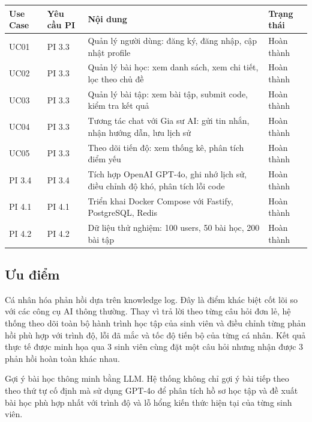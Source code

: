 \documentclass[../main.tex]{subfiles}
\begin{document}
{
\renewcommand{\arraystretch}{1.5}
\begin{tabularx}{\textwidth}{|p{2.0cm}|p{3.5cm}|X|p{3.5cm}|}
\caption{Checklist thi công các Use Case theo yêu cầu PI}
\label{tab:checklist-thi-cong-cac-use-case-theo-yeu-cau-pi}
\\
\hline
\textbf{Use Case} & \textbf{Yêu cầu PI} & \textbf{Nội dung} & \textbf{Trạng thái} \\
\hline
UC01 & PI 3.3 & Quản lý người dùng: đăng ký, đăng nhập, cập nhật profile & Hoàn thành \\
\hline
UC02 & PI 3.3 & Quản lý bài học: xem danh sách, xem chi tiết, lọc theo chủ đề & Hoàn thành \\
\hline
UC03 & PI 3.3 & Quản lý bài tập: xem bài tập, submit code, kiểm tra kết quả & Hoàn thành \\
\hline
UC04 & PI 3.3 & Tương tác chat với Gia sư AI: gửi tin nhắn, nhận hướng dẫn, lưu lịch sử & Hoàn thành \\
\hline
UC05 & PI 3.3 & Theo dõi tiến độ: xem thống kê, phân tích điểm yếu & Hoàn thành \\
\hline
PI 3.4 & PI 3.4 & Tích hợp OpenAI GPT-4o, ghi nhớ lịch sử, điều chỉnh độ khó, phân tích lỗi code & Hoàn thành \\
\hline
PI 4.1 & PI 4.1 & Triển khai Docker Compose với Fastify, PostgreSQL, Redis & Hoàn thành \\
\hline
PI 4.2 & PI 4.2 & Dữ liệu thử nghiệm: 100 users, 50 bài học, 200 bài tập & Hoàn thành \\
\hline
\end{tabularx}
}

\subsection{Ưu điểm}

Cá nhân hóa phản hồi dựa trên knowledge log. Đây là điểm khác biệt cốt lõi so với các công cụ AI thông thường. Thay vì trả lời theo từng câu hỏi đơn lẻ, hệ thống theo dõi toàn bộ hành trình học tập của sinh viên và điều chỉnh từng phản hồi phù hợp với trình độ, lỗi đã mắc và tốc độ tiến bộ của từng cá nhân. Kết quả thực tế được minh họa qua 3 sinh viên cùng đặt một câu hỏi nhưng nhận được 3 phản hồi hoàn toàn khác nhau.

Gợi ý bài học thông minh bằng LLM. Hệ thống không chỉ gợi ý bài tiếp theo theo thứ tự cố định mà sử dụng GPT-4o để phân tích hồ sơ học tập và đề xuất bài học phù hợp nhất với trình độ và lỗ hổng kiến thức hiện tại của từng sinh viên.
\end{document}
